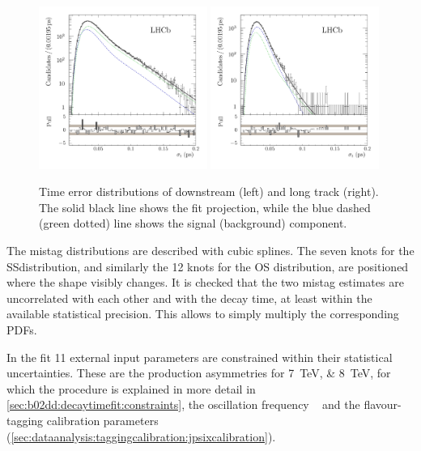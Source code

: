 \begin{figure}[htb]
\includegraphics[width=0.49\textwidth]{06-Bd2JpsiKS/tikz/pdf/obsTimeErr_downstream_pull_logy.pdf}
\includegraphics[width=0.49\textwidth]{06-Bd2JpsiKS/tikz/pdf/obsTimeErr_longtrack_pull_logy.pdf}
\caption{
Time error distributions of downstream (left) and long track (right). The solid black line
shows the fit projection, while the blue dashed (green dotted) line shows the
signal (background) component.}
\label{fig:bd2jpsiks:nominalfit:time_error}
\end{figure}

The mistag distributions are described with cubic splines. The seven knots for
the SS\pion distribution, and similarly the 12 knots for the OS distribution,
are positioned where the shape visibly changes. It is checked that the two
mistag estimates are uncorrelated with each other and with the decay time, at
least within the available statistical precision. This allows to simply
multiply the corresponding PDFs.

In the fit 11 external input parameters are constrained within their
statistical uncertainties. These are the production asymmetries for
\SIlist{7;8}{\TeV}, for which the procedure is explained in more detail in
\cref{sec:b02dd:decaytimefit:constraints}, the oscillation frequency
\dmd~\cite{PDG2014} and the flavour-tagging calibration parameters
(\cref{sec:dataanalysis:taggingcalibration:jpsixcalibration}).

